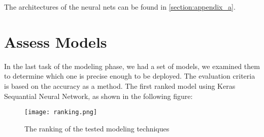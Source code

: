 The architectures of the neural nets can be found in \autoref{section:appendix_a}.

\section{Assess Models}

In the last task of the modeling phase, we had a set of models, we examined them to determine which one is precise enough to be deployed.\newline \newline
The evaluation criteria is based on the accuracy as a method.\newline \newline
The first ranked model using Keras Sequantial Neural Network, as shown in the following figure:
\begin{figure}[H]
\begin{center}
\texttt{[image: ranking.png]}
\end{center}
\caption{The ranking of the tested modeling techniques}
\label{fig:ranking}
\end{figure}
